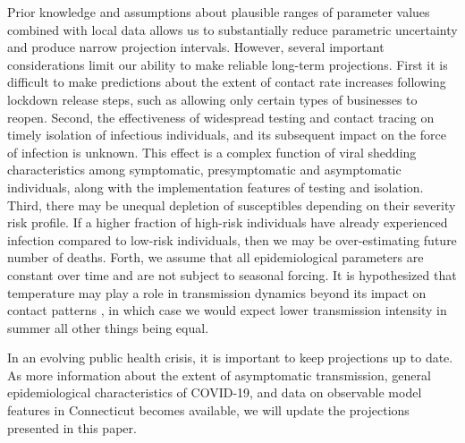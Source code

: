 \documentclass[11pt]{article}
\begin{document}
Prior knowledge and assumptions about plausible ranges of parameter values combined with local data allows us to substantially reduce parametric uncertainty and produce narrow projection intervals. However, several important considerations limit our ability to make reliable long-term projections. First it is difficult to make predictions about the extent of contact rate increases following lockdown release steps, such as allowing only certain types of businesses to reopen. Second, the effectiveness of widespread testing and contact tracing on timely isolation of infectious individuals, and its subsequent impact on the force of infection is unknown. This effect is a complex function of viral shedding characteristics among symptomatic, presymptomatic and asymptomatic individuals, along with the implementation features of testing and isolation. Third, there may be unequal depletion of susceptibles depending on their severity risk profile. If a higher fraction of high-risk individuals have already experienced infection compared to low-risk individuals, then we may be over-estimating future number of deaths. Forth, we assume that all epidemiological parameters are constant over time and are not subject to seasonal forcing. It is hypothesized that temperature may play a role in transmission dynamics beyond its impact on contact patterns \citep{kissler2020projecting}, in which case we would expect lower transmission intensity in summer all other things being equal.

In an evolving public health crisis, it is important to keep projections up to date. As more information about the extent of asymptomatic transmission, general epidemiological characteristics of COVID-19, and data on observable model features in Connecticut becomes available, we will update the projections presented in this paper.







\end{document}
